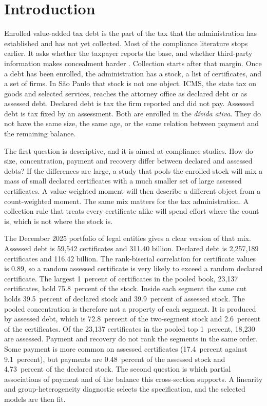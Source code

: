 \section{Introduction}\label{sec:intro}

Enrolled value-added tax debt is the part of the tax that the administration has established and has not yet collected.
Most of the compliance literature stops earlier.
It asks whether the taxpayer reports the base, and whether third-party information makes concealment harder \citep{allingham1972,kleven2011,pomeranz2015}.
Collection starts after that margin.
Once a debt has been enrolled, the administration has a stock, a list of certificates, and a set of firms.
In S\~ao Paulo that stock is not one object.
ICMS, the state tax on goods and selected services, reaches the attorney office as declared debt or as assessed debt.
Declared debt is tax the firm reported and did not pay.
Assessed debt is tax fixed by an assessment.
Both are enrolled in the \emph{d\'ivida ativa}.
They do not have the same size, the same age, or the same relation between payment and the remaining balance.

The first question is descriptive, and it is aimed at compliance studies.
How do size, concentration, payment and recovery differ between declared and assessed debts?
If the differences are large, a study that pools the enrolled stock will mix a mass of small declared certificates with a much smaller set of large assessed certificates.
A value-weighted moment will then describe a different object from a count-weighted moment.
The same mix matters for the tax administration.
A collection rule that treats every certificate alike will spend effort where the count is, which is not where the stock is.

The December 2025 portfolio of legal entities gives a clear version of that mix.
Assessed debt is 59,542 certificates and \brl{}311.40 billion.
Declared debt is 2,257,189 certificates and \brl{}116.42 billion.
The rank-biserial correlation for certificate values is 0.89, so a random assessed certificate is very likely to exceed a random declared certificate.
The largest 1~percent of certificates in the pooled book, 23,137 certificates, hold 75.8~percent of the stock.
Inside each segment the same cut holds 39.5~percent of declared stock and 39.9~percent of assessed stock.
The pooled concentration is therefore not a property of each segment.
It is produced by assessed debt, which is 72.8~percent of the two-segment stock and 2.6~percent of the certificates.
Of the 23,137 certificates in the pooled top 1~percent, 18,230 are assessed.
Payment and recovery do not rank the segments in the same order.
Some payment is more common on assessed certificates (17.4~percent against 9.1~percent), but payments are 0.48~percent of the assessed stock and 4.73~percent of the declared stock.
The second question is which partial associations of payment and of the balance this cross-section supports.
A linearity and group-heterogeneity diagnostic selects the specification, and the selected models are then fit.

